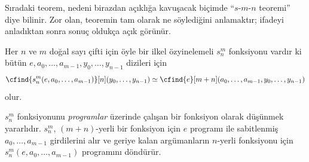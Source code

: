 \documentclass[../../../include/open-logic-section]{subfiles}
\begin{document}

\begin{explain}
Sıradaki teorem, nedeni birazdan açıklığa kavuşacak biçimde
``$s$-$m$-$n$ teoremi'' diye bilinir. Zor olan, teoremin tam olarak ne
söylediğini anlamaktır; ifadeyi anladıktan sonra sonuç oldukça açık görünür.
\end{explain}

\begin{thm}
  Her $n$ ve $m$ doğal sayı çifti için öyle bir ilkel özyinelemeli
  $s^m_n$ fonksiyonu vardır ki bütün
  $e,a_0,\dots,a_{m-1},y_0,\dots,y_{n-1}$ dizileri için
  \[
    \cfind{s^m_n(e,a_0,\dots,a_{m-1})}[n](y_0,\dots,y_{n-1})\simeq
    \cfind{e}[m+n](a_0,\dots,a_{m-1},y_0,\dots,y_{n-1})
  \]
  olur.
\end{thm}

\begin{explain}
$s^m_n$ fonksiyonunu \emph{programlar} üzerinde çalışan bir fonksiyon olarak
düşünmek yararlıdır. $s^m_n$, $(m+n)$-yerli bir fonksiyon için $e$ programı
ile sabitlenmiş $a_0,\dots,a_{m-1}$ girdilerini alır ve geriye kalan
argümanların $n$-yerli fonksiyonu için
$s^m_n(e,a_0,\dots,a_{m-1})$ programını döndürür.
\end{explain}
\end{document}
